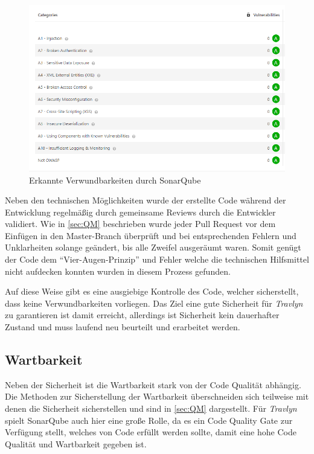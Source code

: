 	\begin{figure}[ht!]
		\centering
		\includegraphics[width=1\textwidth]{images/Verwundbarkeiten_SonarQube.png}
		\caption{Erkannte Verwundbarkeiten durch SonarQube}
		\label{fig:sonarqube_result}
	\end{figure}

	Neben den technischen Möglichkeiten wurde der erstellte Code während der Entwicklung regelmäßig durch gemeinsame Reviews durch die Entwickler validiert. Wie in \autoref{sec:QM} beschrieben wurde jeder Pull Request vor dem Einfügen in den Master-Branch überprüft und bei entsprechenden Fehlern und Unklarheiten solange geändert, bis alle Zweifel ausgeräumt waren. Somit genügt der Code dem \enquote{Vier-Augen-Prinzip} und Fehler welche die technischen Hilfsmittel nicht aufdecken konnten wurden in diesem Prozess gefunden.
	
	\vspace{0.25cm}
	
	Auf diese Weise gibt es eine ausgiebige Kontrolle des Code, welcher sicherstellt, dass keine Verwundbarkeiten vorliegen. Das Ziel eine gute Sicherheit für \textit{Travlyn} zu garantieren ist damit erreicht, allerdings ist Sicherheit kein dauerhafter Zustand und muss laufend neu beurteilt und erarbeitet werden.
	
	\subsection{Wartbarkeit}
	Neben der Sicherheit ist die Wartbarkeit stark von der Code Qualität abhängig. Die Methoden zur Sicherstellung der Wartbarkeit überschneiden sich teilweise mit denen die Sicherheit sicherstellen und sind in \autoref{sec:QM} dargestellt. Für \textit{Travlyn} spielt SonarQube auch hier eine große Rolle, da es ein Code Quality Gate zur Verfügung stellt, welches von Code erfüllt werden sollte, damit eine hohe Code Qualität und Wartbarkeit gegeben ist.
	
